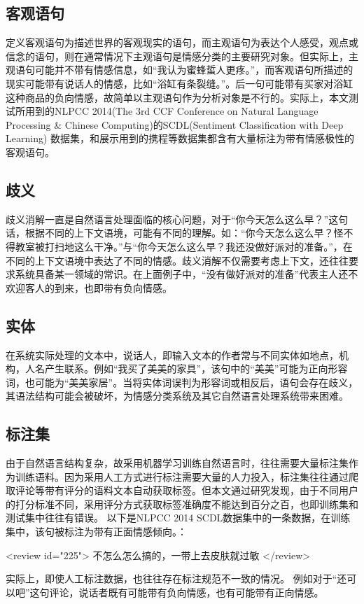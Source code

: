 \subsection{客观语句}
定义客观语句为描述世界的客观现实的语句，而主观语句为表达个人感受，观点或信念的语句\cite{Liu2016}，则在通常情况下主观语句是情感分类的主要研究对象。但实际上，主观语句可能并不带有情感信息，如“我认为蜜蜂蜇人更疼。”，而客观语句所描述的现实可能带有说话人的情感，比如“浴缸有条裂缝。”。后一句可能带有买家对浴缸这种商品的负向情感，故简单以主观语句作为分析对象是不行的。实际上，本文测试所用到的NLPCC 2014(The 3rd CCF Conference on Natural Language Processing \& Chinese Computing)的SCDL(Sentiment Classification with Deep Learning) 数据集，和展示用到的携程等数据集都含有大量标注为带有情感极性的客观语句。
\subsection{歧义}
歧义消解一直是自然语言处理面临的核心问题，对于“你今天怎么这么早？”这句话，根据不同的上下文语境，可能有不同的理解。如：“你今天怎么这么早？怪不得教室被打扫地这么干净。”与“你今天怎么这么早？我还没做好派对的准备。”，在不同的上下文语境中表达了不同的情感。歧义消解不仅需要考虑上下文，还往往要求系统具备某一领域的常识。在上面例子中，“没有做好派对的准备”代表主人还不欢迎客人的到来，也即带有负向情感。
\subsection{实体}
在系统实际处理的文本中，说话人，即输入文本的作者常与不同实体如地点，机构，人名产生联系。例如“我买了美美的家具”，该句中的“美美”可能为正向形容词，也可能为“美美家居”。当将实体词误判为形容词或相反后，语句会存在歧义，其语法结构可能会被破坏，为情感分类系统及其它自然语言处理系统带来困难。
\subsection{标注集}
由于自然语言结构复杂，故采用机器学习训练自然语言时，往往需要大量标注集作为训练语料。因为采用人工方式进行标注需要大量的人力投入，标注集往往通过爬取评论等带有评分的语料文本自动获取标签。但本文通过研究发现，由于不同用户的打分标准不同，采用评分方式获取标签准确度不能达到百分之百，也即训练集和测试集中往往有错误。
以下是NLPCC 2014 SCDL数据集中的一条数据，在训练集中，该句被标注为带有正面情感倾向。：
 
    <review id="225">
        不怎么怎么搞的，一带上去皮肤就过敏
    </review>
   
实际上，即使人工标注数据，也往往存在标注规范不一致的情况。
例如对于“还可以吧”这句评论，说话者既有可能带有负向情感，也有可能带有正向情感。
